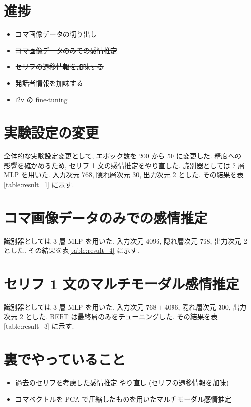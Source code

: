 \documentclass[twocolumn]{jarticle}     %
\begin{document}

\section{進捗}

\begin{itemize}
  \item \sout{コマ画像データの切り出し}
  \item \sout{コマ画像データのみでの感情推定}
  \item \sout{セリフの遷移情報を加味する}
  \item 発話者情報を加味する
  \item i2v の fine-tuning
\end{itemize}

\section{実験設定の変更}
全体的な実験設定変更として, エポック数を 200 から 50 に変更した. 精度への影響を確かめるため, セリフ 1 文の感情推定をやり直した. 識別器としては 3 層 MLP を用いた. 入力次元 768, 隠れ層次元 30, 出力次元 2 とした.
その結果を表\ref{table:result_1} に示す.

\section{コマ画像データのみでの感情推定}
識別器としては 3 層 MLP を用いた. 入力次元 4096, 隠れ層次元 768, 出力次元 2 とした.
その結果を表\ref{table:result_4} に示す.

\section{セリフ 1 文のマルチモーダル感情推定}
識別器としては 3 層 MLP を用いた. 入力次元 $768+4096$, 隠れ層次元 300, 出力次元 2 とした. BERT は最終層のみをチューニングした.
その結果を表\ref{table:result_3} に示す.

\section{裏でやっていること}
\begin{itemize}
  \item 過去のセリフを考慮した感情推定 やり直し (セリフの遷移情報を加味)
  \item コマベクトルを PCA で圧縮したものを用いたマルチモーダル感情推定
\end{itemize}
\end{document}

